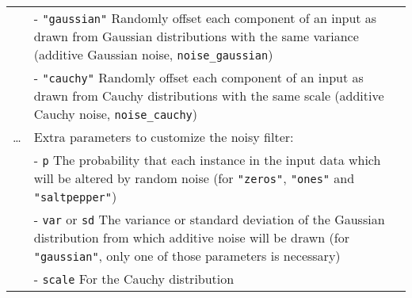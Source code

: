 \begin{longtable}[c]{@{}ll@{}}
\begin{minipage}[t]{0.07\columnwidth}
\strut\end{minipage} &
\begin{minipage}[t]{0.87\columnwidth}\raggedright\strut
- \texttt{"gaussian"} Randomly offset each component of an input as
drawn from Gaussian distributions with the same variance (additive
Gaussian noise, \texttt{noise\_gaussian})
\strut\end{minipage}\tabularnewline
\begin{minipage}[t]{0.07\columnwidth}\raggedright\strut
\strut\end{minipage} &
\begin{minipage}[t]{0.87\columnwidth}\raggedright\strut
- \texttt{"cauchy"} Randomly offset each component of an input as drawn
from Cauchy distributions with the same scale (additive Cauchy noise,
\texttt{noise\_cauchy})
\strut\end{minipage}\tabularnewline
\begin{minipage}[t]{0.07\columnwidth}\raggedright\strut
\ldots{}
\strut\end{minipage} &
\begin{minipage}[t]{0.87\columnwidth}\raggedright\strut
Extra parameters to customize the noisy filter:
\strut\end{minipage}\tabularnewline
\begin{minipage}[t]{0.07\columnwidth}\raggedright\strut
\strut\end{minipage} &
\begin{minipage}[t]{0.87\columnwidth}\raggedright\strut
- \texttt{p} The probability that each instance in the input data which
will be altered by random noise (for \texttt{"zeros"}, \texttt{"ones"}
and \texttt{"saltpepper"})
\strut\end{minipage}\tabularnewline
\begin{minipage}[t]{0.07\columnwidth}\raggedright\strut
\strut\end{minipage} &
\begin{minipage}[t]{0.87\columnwidth}\raggedright\strut
- \texttt{var} or \texttt{sd} The variance or standard deviation of the
Gaussian distribution from which additive noise will be drawn (for
\texttt{"gaussian"}, only one of those parameters is necessary)
\strut\end{minipage}\tabularnewline
\begin{minipage}[t]{0.07\columnwidth}\raggedright\strut
\strut\end{minipage} &
\begin{minipage}[t]{0.87\columnwidth}\raggedright\strut
- \texttt{scale} For the Cauchy distribution
\strut\end{minipage}\tabularnewline
\bottomrule
\end{longtable}

